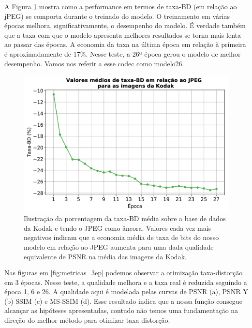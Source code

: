 A Figura \ref{fig:taxa_bd} mostra como a performance em termos de taxa-BD (em relação ao jPEG) se comporta durante o treinado do modelo. O treinamento em várias épocas melhora, significativamente, o desempenho do modelo. É verdade também que a taxa com que o modelo apresenta melhores resultados se torna mais lenta ao passar das épocas. A economia da taxa na última época em relação à primeira é aproximadamente de 17\%. Nesse teste, a 26ª época gerou o modelo de melhor desempenho. Vamos nos referir a esse \acrshort{codec} como modelo26.  



\begin{figure}
	\centering
	\includegraphics[width=1\textwidth]{figuras/taxa_bd_27epocas.pdf}
	\caption[Curva de taxa-BD por época de treinamento.]{Ilustração da porcentagem da taxa-BD média sobre a base de dados da Kodak e tendo o JPEG como âncora.  Valores cada vez mais negativos indicam que a economia média de taxa de bits do nosso modelo em relação ao JPEG aumenta para uma dada qualidade equivalente de PSNR na média das imagens da Kodak.}  
	\label{fig:taxa_bd}
\end{figure}	

Nas figuras em \ref{fig:metricas_3ep} podemos observar a otimização taxa-distorção em 3 épocas. Nesse teste, a qualidade melhora e a taxa real é reduzida seguindo a época 1, 6 e 26. A qualidade aqui é modelada pelas curvas de PSNR (a), PSNR Y (b)  SSIM (c) e  MS-SSIM (d). Esse resultado indica que a nossa função consegue alcançar as hipóteses apresentadas, contudo não temos uma fundamentação na direção do melhor método para otimizar taxa-distorção.  

